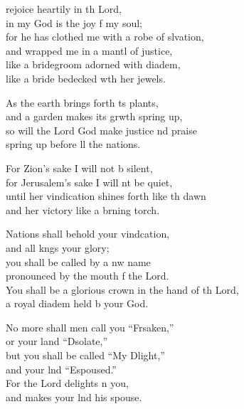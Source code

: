 \settowidth{\versewidth}{You shall be a glorious crown in the hand of the Lord, *}
\begin{psalmverse}%
  \begin{patverse}
 rejoice heartily in th Lord,\Med\\
in my God is the joy f my soul;\\
for he has clothed me with a robe of slvation,\Med\\
and wrapped me in a mantl of justice,\\
like a bridegroom adorned with  diadem,\Med\\
like a bride bedecked w\pointup{\i}th her jewels.

As the earth brings forth \pointup{\i}ts plants,\Med\\
and a garden makes its grwth spring up,\\
so will the Lord God make justice nd praise\Med\\
spring up before ll the nations.

For Zion’s sake I will not b silent,\Med\\
for Jerusalem’s sake I will nt be quiet,\\
until her vindication shines forth like th dawn\Med\\
and her victory like a brning torch.

Nations shall behold your vind\pointup{\i}cation,\Med\\
and all k\pointup{\i}ngs your glory;\\
you shall be called by a nw name\Med\\
pronounced by the mouth f the Lord.\\
You shall be a glorious crown in the hand of th Lord,\Med\\
a royal diadem held b your God.

No more shall men call you “Frsaken,”\Med\\
or your land “Dsolate,”\\
but you shall be called “My Dlight,”\Med\\
and your lnd “Espoused.”\\
For the Lord delights \pointup{\i}n you,\Med\\
and makes your lnd his spouse.


\end{patverse}
\end{psalmverse}
